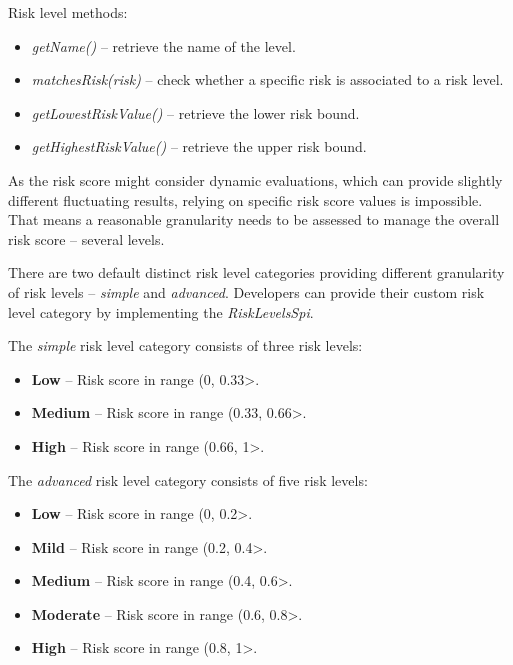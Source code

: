 Risk level methods:
\begin{itemize}
    \item \textit{getName()} -- retrieve the name of the level.
    \item \textit{matchesRisk(risk)} -- check whether a specific risk is associated to a risk level.
    \item \textit{getLowestRiskValue()} -- retrieve the lower risk bound.
    \item \textit{getHighestRiskValue()} -- retrieve the upper risk bound.
\end{itemize}

As the risk score might consider dynamic evaluations, which can provide slightly different fluctuating results, relying on specific risk score values is impossible.
That means a reasonable granularity needs to be assessed to manage the overall risk score -- several levels.

There are two default distinct risk level categories providing different granularity of risk levels -- \textit{simple} and \textit{advanced}.
Developers can provide their custom risk level category by implementing the \textit{RiskLevelsSpi}.

\newpage

The \textit{simple} risk level category consists of three risk levels:
\begin{itemize}
    \item \textbf{Low} -- Risk score in range (0, 0.33>.
    \item \textbf{Medium} -- Risk score in range (0.33, 0.66>.
    \item \textbf{High} -- Risk score in range (0.66, 1>.
\end{itemize}

The \textit{advanced} risk level category consists of five risk levels:
\begin{itemize}
    \item \textbf{Low} -- Risk score in range (0, 0.2>.
    \item \textbf{Mild} -- Risk score in range (0.2, 0.4>.
    \item \textbf{Medium} -- Risk score in range (0.4, 0.6>.
    \item \textbf{Moderate} -- Risk score in range (0.6, 0.8>.
    \item \textbf{High} -- Risk score in range (0.8, 1>.
\end{itemize}

